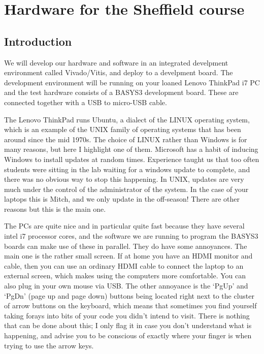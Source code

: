 \documentclass[../physical_computing.tex]{subfiles}
\begin{document}
\chapter{Hardware for the Sheffield course}
\label{sec:our_hardware}

\section{Introduction}
\label{sec:hardwareintro}

We will develop our hardware and software in an integrated develpment environment called Vivado/Vitis, and deploy to a develpment board. The development environment will be running on your loaned Lenovo ThinkPad i7 PC and the test hardware consists of a BASYS3 development board. These are connected together with a USB to micro-USB cable. 

The Lenovo ThinkPad runs Ubuntu, a dialect of the LINUX operating system, which is an example of the UNIX family of operating systems that has been around since the mid 1970s. The choice of LINUX rather than Windows is for many reasons, but here I highlight one of them. Microsoft has a habit of inducing Windows to install updates at random times. Experience taught us that too often students were sitting in the lab waiting for a windows update to complete, and there was no obvious way to stop this happening. In UNIX, updates are very much under the control of the administrator of the system. In the case of your laptops this is Mitch, and we only update in the off-season! There are other reasons but this is the main one.

The PCs are quite nice and in particular quite fast because they have several intel i7 processor cores, and the software we are running to program the BASYS3 boards can make use of these in parallel. They do have some annoyances. The main one is the rather small screen. If at home you have an HDMI monitor and cable, then you can use an ordinary HDMI cable to connect the laptop to an external screen, which makes using the computers more comfortable. You can also plug in your own mouse via USB. The other annoyance is the ‘PgUp’ and ‘PgDn’ (page up and page down) buttons being located right next to the cluster of arrow buttons on the keyboard, which means that sometimes you find yourself taking forays into bits of your code you didn’t intend to visit. There is nothing that can be done about this; I only flag it in case you don’t understand what is happening, and advise you to be conscious of exactly where your finger is when trying to use the arrow keys.
\end{document}
